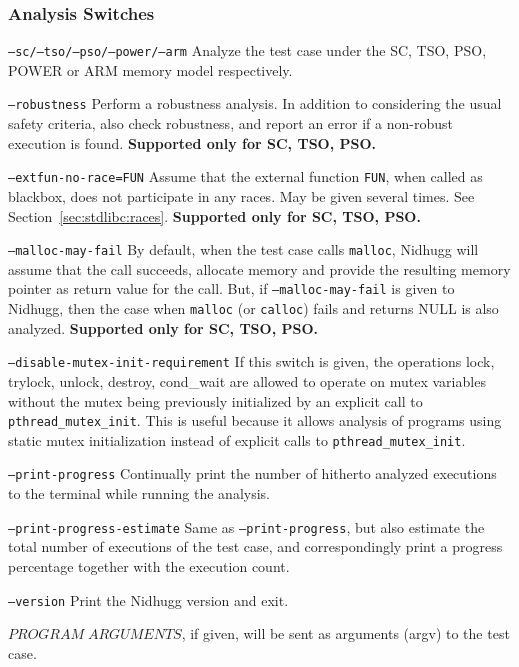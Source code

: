 \documentclass[a4paper]{article}
\newcommand{\limitsupport}[1]{\textbf{Supported only for #1.}}
\begin{document}
\subsubsection{Analysis Switches}\label{sec:analysis:switches}

\begin{description}
\item{\texttt{--sc/--tso/--pso/--power/--arm}}
%
  Analyze the test case under the SC, TSO, PSO, POWER or ARM memory
  model respectively.
\item{\texttt{--robustness}}
%
  Perform a robustness analysis. In addition to considering the usual
  safety criteria, also check robustness, and report an error if a
  non-robust execution is found.
%
  \limitsupport{SC, TSO, PSO}
\item{\texttt{--extfun-no-race=FUN}}
%
  Assume that the external function \texttt{FUN}, when called as
  blackbox, does not participate in any races. May be given several
  times. See Section~\ref{sec:stdlibc:races}.
%
  \limitsupport{SC, TSO, PSO}
\item{\texttt{--malloc-may-fail}}
%
  By default, when the test case calls \texttt{malloc}, Nidhugg will
  assume that the call succeeds, allocate memory and provide the
  resulting memory pointer as return value for the call. But, if
  \texttt{--malloc-may-fail} is given to Nidhugg, then the case when
  \texttt{malloc} (or \texttt{calloc}) fails and returns NULL is also
  analyzed.
%
  \limitsupport{SC, TSO, PSO}
\item{\texttt{--disable-mutex-init-requirement}}
%
  If this switch is given, the operations lock, trylock, unlock,
  destroy, cond\_wait are allowed to operate on mutex variables
  without the mutex being previously initialized by an explicit call
  to \texttt{pthread\_mutex\_init}. This is useful because it allows
  analysis of programs using static mutex initialization instead of
  explicit calls to \texttt{pthread\_mutex\_init}.
\item{\texttt{--print-progress}}
%
  Continually print the number of hitherto analyzed executions to the
  terminal while running the analysis.
\item{\texttt{--print-progress-estimate}}
%
  Same as \texttt{--print-progress}, but also estimate the total
  number of executions of the test case, and correspondingly print a
  progress percentage together with the execution count.
\item{\texttt{--version}}
%
  Print the Nidhugg version and exit.
\item{$PROGRAM\;ARGUMENTS$}, if given, will be sent as arguments
  (argv) to the test case.
\end{description}
\end{document}
